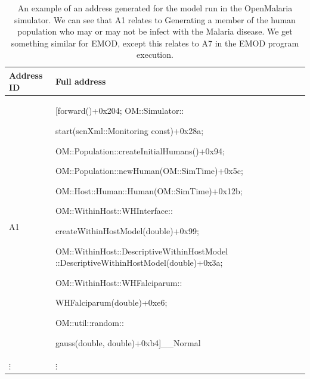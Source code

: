 \documentclass{article}
\begin{document}
\begin{table}[h!]
\footnotesize
  \setlength{\tabcolsep}{1mm}
\label{table:asingleaddress}
  \caption{An example of an address generated for the model run in the OpenMalaria simulator. We can see that A1
  relates to Generating a member of the human population who may or may not be infect with the Malaria disease. We get something similar for EMOD, except this relates to A7 in the EMOD program execution.}
  \def\arraystretch{1.25}
  \begin{tabularx}{0.46\textwidth}{@{}lX@{}l@{}} 
    \toprule
    Address ID & Full address \\
    \midrule
  A1 & [forward()+0x204; OM::Simulator::

  start(scnXml::Monitoring const)+0x28a;

  OM::Population::createInitialHumans()+0x94;

  OM::Population::newHuman(OM::SimTime)+0x5c;

  OM::Host::Human::Human(OM::SimTime)+0x12b;

  OM::WithinHost::WHInterface::

  createWithinHostModel(double)+0x99;

  OM::WithinHost::DescriptiveWithinHostModel
  ::DescriptiveWithinHostModel(double)+0x3a;

  OM::WithinHost::WHFalciparum::

  WHFalciparum(double)+0xe6;

  OM::util::random::

  gauss(double, double)+0xb4]\_\_Normal \\

  $\vdots$ & $\vdots$ \\









\bottomrule
  \end{tabularx}
  \end{table}
\end{document}
